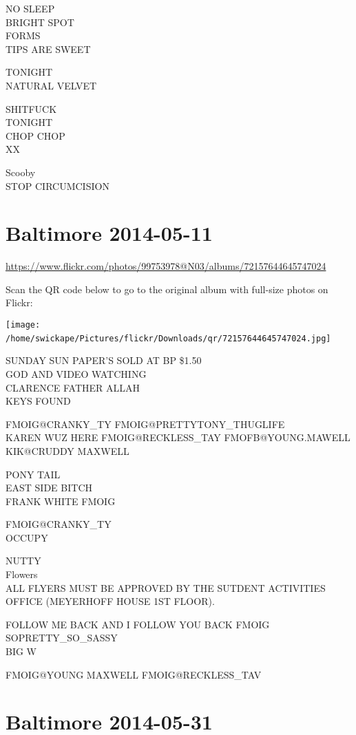 \documentclass[10pt,letterpaper]{article}
\begin{document}
NO SLEEP\\
BRIGHT SPOT\\
FORMS\\
TIPS ARE SWEET

TONIGHT\\
NATURAL VELVET

SHITFUCK\\
TONIGHT\\
CHOP CHOP\\
XX

Scooby\\
STOP CIRCUMCISION
\

\section*{Baltimore 2014-05-11}

\url{https://www.flickr.com/photos/99753978@N03/albums/72157644645747024}

Scan the QR code below to go to the original album with full-size photos on Flickr:

\texttt{[image: /home/swickape/Pictures/flickr/Downloads/qr/72157644645747024.jpg]}
\

SUNDAY SUN PAPER'S SOLD AT BP \$1.50\\
GOD AND VIDEO WATCHING\\
CLARENCE FATHER ALLAH\\
KEYS FOUND

FMOIG@CRANKY\_TY FMOIG@PRETTYTONY\_THUGLIFE\\
KAREN WUZ HERE FMOIG@RECKLESS\_TAY FMOFB@YOUNG.MAWELL KIK@CRUDDY MAXWELL

PONY TAIL\\
EAST SIDE BITCH\\
FRANK WHITE FMOIG

FMOIG@CRANKY\_TY\\
OCCUPY

NUTTY\\
Flowers\\
ALL FLYERS MUST BE APPROVED BY THE SUTDENT ACTIVITIES OFFICE (MEYERHOFF HOUSE 1ST FLOOR).

FOLLOW ME BACK AND I FOLLOW YOU BACK FMOIG SOPRETTY\_SO\_SASSY\\
BIG W

FMOIG@YOUNG MAXWELL FMOIG@RECKLESS\_TAV
\

\section*{Baltimore 2014-05-31}
\end{document}
